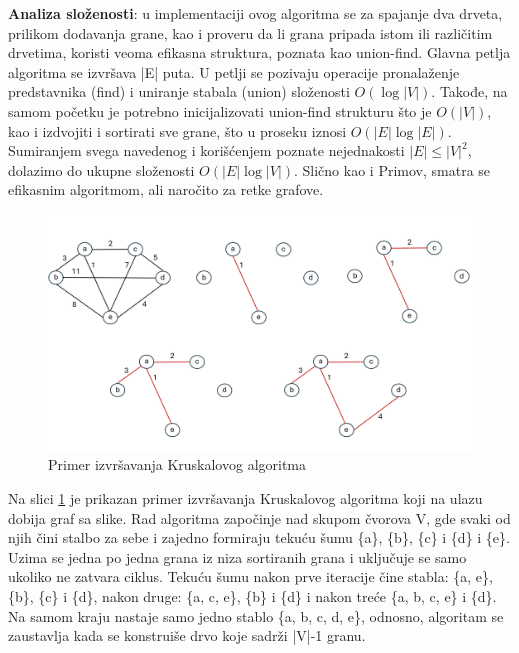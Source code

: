 \documentclass[12pt,oneside]{memoir}
\begin{document}
\textbf{Analiza složenosti}: u implementaciji ovog algoritma se za spajanje dva drveta, prilikom dodavanja grane, kao i proveru da li grana pripada istom ili različitim drvetima, koristi veoma efikasna struktura, poznata kao union-find. Glavna petlja algoritma se izvršava |E| puta. U petlji se pozivaju operacije pronalaženje predstavnika (find) i uniranje stabala (union) složenosti \( O(\log |V|) \). Takođe, na samom početku je potrebno inicijalizovati union-find strukturu što je \( O(|V|) \), kao i izdvojiti i sortirati sve grane, što u proseku iznosi  \( O(|E|\log |E|) \). Sumiranjem svega navedenog i korišćenjem poznate nejednakosti $|E| \leq |V|^2$, dolazimo do ukupne složenosti \( O(|E|\log |V|) \). Slično kao i Primov, smatra se efikasnim algoritmom, ali naročito za retke grafove.

\begin{figure}[!ht]
  \centering
  \label{fig:Kruskal}
  \includegraphics[width=1.0\textwidth]{matfmaster/KruskalAlgo.png}
  \caption{Primer izvršavanja Kruskalovog algoritma}
\end{figure}

Na slici \ref{fig:Kruskal} je prikazan primer izvršavanja Kruskalovog algoritma koji na ulazu dobija graf sa slike. Rad algoritma započinje nad skupom čvorova V, gde svaki od njih čini stalbo za sebe i zajedno formiraju tekuću šumu \{a\}, \{b\}, \{c\} i \{d\} i \{e\}. Uzima se jedna po jedna grana iz niza sortiranih grana i uključuje se samo ukoliko ne zatvara ciklus. Tekuću šumu nakon prve iteracije čine stabla: \{a, e\}, \{b\}, \{c\} i \{d\}, nakon druge: \{a, c, e\},  \{b\} i  \{d\} i  nakon treće \{a, b, c, e\} i \{d\}. Na samom kraju nastaje samo jedno stablo \{a, b, c, d, e\}, odnosno, algoritam se zaustavlja kada se konstruiše drvo koje sadrži |V|-1 granu.
\end{document}
